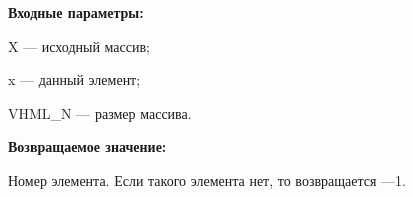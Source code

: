 \textbf{Входные параметры:}

X --- исходный массив;
 
x --- данный элемент;
 
VHML\_N --- размер массива.

\textbf{Возвращаемое значение:}
 
Номер элемента. Если такого элемента нет, то возвращается ---1.
